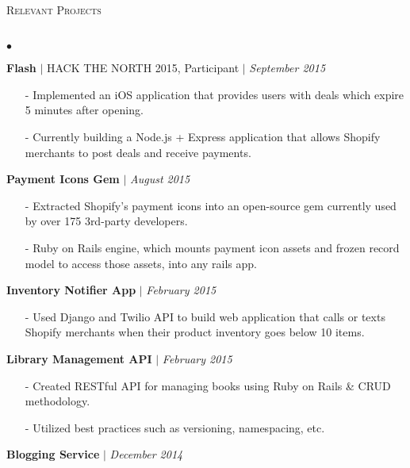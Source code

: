 \documentclass[10pt]{article}
\newcommand{\lineunder}{\vspace*{-8pt} \\ \hspace*{-18pt} \hrulefill \\}
\newcommand{\header}[1]{{\hspace*{-15pt}\vspace*{6pt} \textsc{#1}} \vspace*{-6pt} \lineunder }
\newenvironment{achievements}{\begin{list}{$\bullet$}{\topsep 0pt \itemsep -1.5pt \leftmargin 5pt}}{\vspace*{4pt}\end{list}}
\begin{document}
\header{\fontsize{11}{12}\selectfont Relevant Projects}
\begin{achievements}
\def\UrlFont{\em}
\item \textbf{Flash} {$|$ \scriptsize HACK THE NORTH 2015, Participant} $|$  \href{https://github.com/nakulpathak3/Flash}{\faGithub} \hfill \textit {September 2015}
\begin{itemize}
\item[-]Implemented an iOS application that provides users with deals which expire 5 minutes after opening.
\item[-]Currently building a Node.js + Express application that allows Shopify merchants to post deals and receive payments.
\end{itemize}
\vspace{2pt}
\item \textbf{Payment Icons Gem} $|$  \href{https://github.com/activemerchant/payment_icons}{\faGithub} \hfill \textit {August 2015}
\begin{itemize}
\item[-]Extracted Shopify's payment icons into an open-source gem currently used by over 175 3rd-party developers.
\item[-]Ruby on Rails engine, which mounts payment icon assets and frozen record model to access those assets, into any rails app.
\end{itemize}
\vspace{2pt}
\item \textbf{Inventory Notifier App} $|$  \href{https://github.com/nakulpathak3/twilio-shopify-notifier}{\faGithub} \hfill \textit {February 2015}
\begin{itemize}
\item[-]Used Django and Twilio API to build web application that calls or texts Shopify merchants when their product inventory goes below 10 items.
\end{itemize}
\vspace{2pt}
\item \textbf{Library Management API} $|$  \href{https://github.com/nakulpathak3/books-api-rails}{\faGithub}  \hfill \textit {February 2015}
\begin{itemize}
\item[-]Created RESTful API for managing books using Ruby on Rails \& CRUD methodology.
\item[-]Utilized best practices such as versioning, namespacing, etc.
\end{itemize}
\vspace{2pt}
\item \textbf{Blogging Service} $|$  \href{https://github.com/nakulpathak3/flask-tutorial}{\faGithub} \hfill \textit {December 2014}

\end{achievements}
\end{document}

